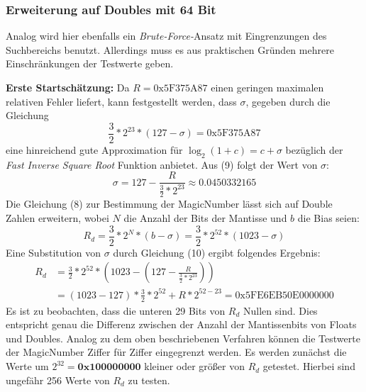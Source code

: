 \documentclass[course=erap]{aspdoc}
\begin{document}
\subsubsection{Erweiterung auf Doubles mit 64 Bit}
Analog wird hier ebenfalls ein \emph{Brute-Force-}Ansatz mit Eingrenzungen des Suchbereichs benutzt. Allerdings muss es aus praktischen Gründen mehrere Einschränkungen der Testwerte geben.\par
\textbf{Erste Startschätzung:}
Da $R = \text{0x5F375A87}$ einen geringen maximalen relativen Fehler liefert, kann festgestellt werden, dass $\sigma$, gegeben durch die Gleichung
\begin{equation}
    \frac{3}{2} * 2^{23} * (127 - \sigma) = \text{0x5F375A87}
\end{equation}
eine hinreichend gute Approximation für $\log_2(1 + c) = c + \sigma$ bezüglich der \emph{Fast Inverse Square Root} Funktion anbietet. Aus (9) folgt der Wert von $\sigma$:
\begin{equation}
    \sigma = 127 - \frac{R}{\frac{3}{2} * 2^{23}} \approx 0.0450332165
\end{equation}
Die Gleichung (8) zur Bestimmung der MagicNumber lässt sich auf Double Zahlen erweitern, wobei $N$ die Anzahl der Bits der Mantisse und $b$ die Bias seien:
\begin{equation*}
    R_d = \frac{3}{2} * 2^{N} * (b - \sigma) 
    = \frac{3}{2} * 2^{52} * (1023 - \sigma)
\end{equation*}
Eine Substitution von $\sigma$ durch Gleichung (10) ergibt folgendes Ergebnis:
\begin{align}
    R_d &= \frac{3}{2} * 2^{52} * \left(1023 - \left(127 - \frac{R}{\frac{3}{2} * 2^{23}}\right)\right) \nonumber \\
    &= (1023 - 127) * \frac{3}{2} * 2^{52} + R * 2^{52 - 23}
    = \text{0x5FE6EB50E0000000}
\end{align}
Es ist zu beobachten, dass die unteren 29 Bits von $R_d$ Nullen sind. Dies entspricht genau die Differenz zwischen der Anzahl der Mantissenbits von Floats und Doubles. Analog zu dem oben beschriebenen Verfahren können die Testwerte der MagicNumber Ziffer für Ziffer eingegrenzt werden. Es werden zunächst die Werte um $2^{32} = \textbf{0x100000000}$ kleiner oder größer von $R_d$ getestet. Hierbei sind ungefähr 256 Werte von $R_d$ zu testen.\par
\end{document}
